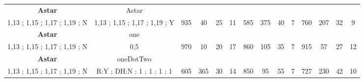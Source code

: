 \begin{table}[]
{\begin{tabular}{|c|c|c|c|c|c|c|c|c|c|c|c|c|c|}
\cellcolor{blue!15}\textbf{Astar} & Astar& {\color[HTML]{00009B} } & {\color[HTML]{9A0000} } & {\color[HTML]{009901} } &  & {\color[HTML]{00009B} } & {\color[HTML]{9A0000} } & {\color[HTML]{009901} } &  & {\color[HTML]{00009B} } & {\color[HTML]{9A0000} } & {\color[HTML]{009901} } &  \\ 
\cellcolor{ blue!15}1,13 ; 1,15 ; 1,17 ; 1,19 ; N & 1,13 ; 1,15 ; 1,17 ; 1,19 ; Y & \multirow{-2}{*}{{\color[HTML]{00009B} 935}} & \multirow{-2}{*}{{\color[HTML]{9A0000} 40}} & \multirow{-2}{*}{{\color[HTML]{009901} 25}} & \multirow{-2}{*}{11} & \multirow{-2}{*}{{\color[HTML]{00009B} 585}} & \multirow{-2}{*}{{\color[HTML]{9A0000} 375}} & \multirow{-2}{*}{{\color[HTML]{009901} 40}} & \multirow{-2}{*}{7} & \multirow{-2}{*}{{\color[HTML]{00009B} 760}} & \multirow{-2}{*}{{\color[HTML]{9A0000} 207}} & \multirow{-2}{*}{{\color[HTML]{009901} 32}} & \multirow{-2}{*}{9} \\ \hline

\cellcolor{blue!15}\textbf{Astar} & one& {\color[HTML]{00009B} } & {\color[HTML]{9A0000} } & {\color[HTML]{009901} } &  & {\color[HTML]{00009B} } & {\color[HTML]{9A0000} } & {\color[HTML]{009901} } &  & {\color[HTML]{00009B} } & {\color[HTML]{9A0000} } & {\color[HTML]{009901} } &  \\ 
\cellcolor{ blue!15}1,13 ; 1,15 ; 1,17 ; 1,19 ; N & 0,5 & \multirow{-2}{*}{{\color[HTML]{00009B} 970}} & \multirow{-2}{*}{{\color[HTML]{9A0000} 10}} & \multirow{-2}{*}{{\color[HTML]{009901} 20}} & \multirow{-2}{*}{17} & \multirow{-2}{*}{{\color[HTML]{00009B} 860}} & \multirow{-2}{*}{{\color[HTML]{9A0000} 105}} & \multirow{-2}{*}{{\color[HTML]{009901} 35}} & \multirow{-2}{*}{7} & \multirow{-2}{*}{{\color[HTML]{00009B} 915}} & \multirow{-2}{*}{{\color[HTML]{9A0000} 57}} & \multirow{-2}{*}{{\color[HTML]{009901} 27}} & \multirow{-2}{*}{12} \\ \hline

\cellcolor{blue!15}\textbf{Astar} & oneDotTwo& {\color[HTML]{00009B} } & {\color[HTML]{9A0000} } & {\color[HTML]{009901} } &  & {\color[HTML]{00009B} } & {\color[HTML]{9A0000} } & {\color[HTML]{009901} } &  & {\color[HTML]{00009B} } & {\color[HTML]{9A0000} } & {\color[HTML]{009901} } &  \\ 
\cellcolor{ blue!15}1,13 ; 1,15 ; 1,17 ; 1,19 ; N & R:Y ; DH:N ; 1 ; 1 ; 1 ; 1 & \multirow{-2}{*}{{\color[HTML]{00009B} 605}} & \multirow{-2}{*}{{\color[HTML]{9A0000} 365}} & \multirow{-2}{*}{{\color[HTML]{009901} 30}} & \multirow{-2}{*}{14} & \multirow{-2}{*}{{\color[HTML]{00009B} 850}} & \multirow{-2}{*}{{\color[HTML]{9A0000} 95}} & \multirow{-2}{*}{{\color[HTML]{009901} 55}} & \multirow{-2}{*}{7} & \multirow{-2}{*}{{\color[HTML]{00009B} 727}} & \multirow{-2}{*}{{\color[HTML]{9A0000} 230}} & \multirow{-2}{*}{{\color[HTML]{009901} 42}} & \multirow{-2}{*}{10} \\ \hline


\end{tabular}}
\end{table}
